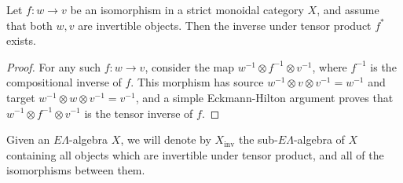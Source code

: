 \documentclass{amsbook} %
\newcommand{\MorLn}{\mathrm{Mor}(L_n)}
\numberwithin{section}{chapter}
\begin{document}
\begin{lem} \label{tensinv_basic} Let $f: w \to v$ be an isomorphism in a strict monoidal category $X$, and assume that both $w, v$ are invertible objects. Then the inverse under tensor product $f^*$ exists.
\end{lem}
\begin{proof}
For any such $f: w \to v$, consider the map $w^{-1} \otimes f^{-1} \otimes v^{-1}$, where $f^{-1}$ is the compositional inverse of $f$. This morphism has source $w^{-1}\otimes v \otimes v^{-1} = w^{-1}$ and target $w^{-1} \otimes w \otimes v^{-1} = v^{-1}$, and a simple Eckmann-Hilton argument proves that $w^{-1} \otimes f^{-1} \otimes v^{-1}$ is the tensor inverse of $f$.
\end{proof}



\begin{Defi}\label{invdef} Given an $E\Lambda$-algebra $X$, we will denote by $X_{\mathrm{inv}}$ the sub-$E\Lambda$-algebra of $X$ containing all objects which are invertible under tensor product, and all of the isomorphisms between them. \end{Defi} 
\end{document}
